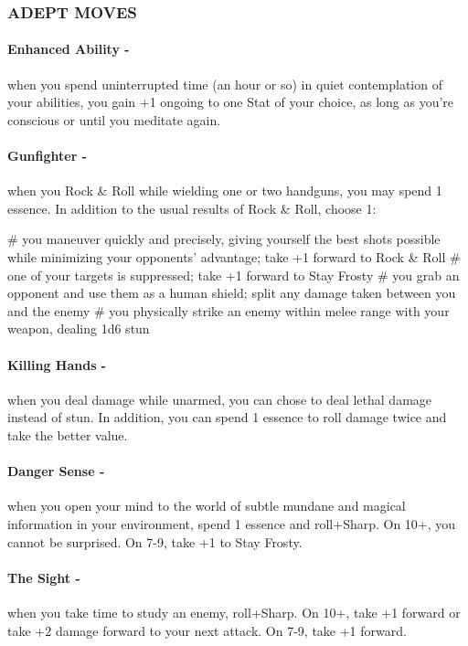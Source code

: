 \subsubsection{ADEPT MOVES}
\paragraph{Enhanced Ability -} when you spend uninterrupted time (an hour or so) in quiet contemplation of your abilities, you gain +1 ongoing to one Stat of your choice, as long as you’re conscious or until you meditate again.

\paragraph{Gunfighter -} when you Rock \& Roll while wielding one or two handguns, you may spend 1 essence. In addition to the usual results of Rock \& Roll, choose 1:
    \begin{easylist}
        # you maneuver quickly and precisely, giving yourself the best shots possible while minimizing your opponents’ advantage; take +1 forward to Rock \& Roll
        # one of your targets is suppressed; take +1 forward to Stay Frosty
        # you grab an opponent and use them as a human shield; split any damage taken between you and the enemy
        # you physically strike an enemy within melee range with your weapon, dealing 1d6 stun
    \end{easylist}

\paragraph{Killing Hands -} when you deal damage while unarmed, you can chose to deal lethal damage instead of stun. In addition, you can spend 1 essence to roll damage twice and take the better value.

\paragraph{Danger Sense -} when you open your mind to the world of subtle mundane and magical information in your environment, spend 1 essence and roll+Sharp. On 10+, you cannot be surprised. On 7-9, take +1 to Stay Frosty.

\paragraph{The Sight -} when you take time to study an enemy, roll+Sharp. On 10+, take +1 forward or take +2 damage forward to your next attack. On 7-9, take +1 forward.

